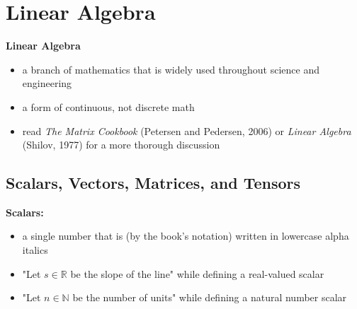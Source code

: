 \documentclass[11pt,twocolumn]{report}
\def\realnumbers{\mathbb{R}}
\def\naturalnumbers{\mathbb{N}}
\begin{document}
\chapter{Linear Algebra}

\textbf{Linear Algebra}
\begin{itemize}
	\item a branch of mathematics that is widely used throughout science and
		engineering
	\item a form of continuous, not discrete math
	\item read \textit{The Matrix Cookbook} (Petersen and Pedersen, 2006) or
		\textit{Linear Algebra} (Shilov, 1977) for a more thorough discussion
\end{itemize}

\section{Scalars, Vectors, Matrices, and Tensors}

\large\textbf{Scalars:}
\begin{itemize}
	\item a single number that is (by the book's notation) written in lowercase
		alpha italics
	\item "Let $ s \in \realnumbers $ be the slope of the line" while defining a
		real-valued scalar
	\item "Let $ n \in \naturalnumbers $ be the number of units" while defining a
		natural number scalar
\end{itemize}
\end{document}
